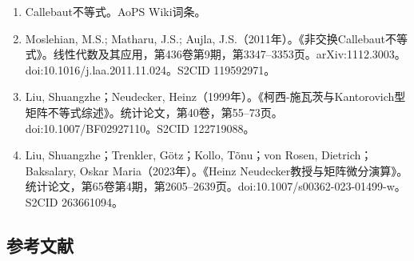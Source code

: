 \begin{enumerate}
\item Callebaut不等式。AoPS Wiki词条。
\item Moslehian, M.S.; Matharu, J.S.; Aujla, J.S.（2011年）。《非交换Callebaut不等式》。线性代数及其应用，第436卷第9期，第3347–3353页。arXiv:1112.3003。doi:10.1016/j.laa.2011.11.024。S2CID 119592971。
\item Liu, Shuangzhe；Neudecker, Heinz（1999年）。《柯西-施瓦茨与Kantorovich型矩阵不等式综述》。统计论文，第40卷，第55–73页。doi:10.1007/BF02927110。S2CID 122719088。
\item Liu, Shuangzhe；Trenkler, Götz；Kollo, Tõnu；von Rosen, Dietrich；Baksalary, Oskar Maria（2023年）。《Heinz Neudecker教授与矩阵微分演算》。统计论文，第65卷第4期，第2605–2639页。doi:10.1007/s00362-023-01499-w。S2CID 263661094。
\end{enumerate}
\subsection{参考文献}
